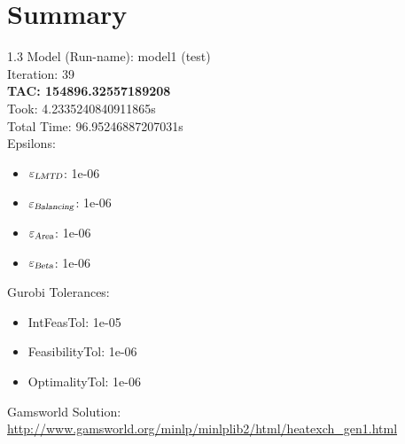 \documentclass{article}%
\begin{document}
%
\normalsize%
\section{Summary}%
\thispagestyle{plain}%
\begin{spacing}{1.3}%
\Large%
Model (Run-name): model1 (test)\\%
Iteration: 39\\%
\textbf{TAC: 154896.32557189208}\\%
Took: 4.2335240840911865s\\%
Total Time: 96.95246887207031s\\%
Epsilons:%
\begin{itemize}%
	\item $\varepsilon_{\textsl{LMTD}}$: 1e-06%
	\item $\varepsilon_{\textsl{Balancing}}$: 1e-06%
	\item $\varepsilon_{\textsl{Area}}$: 1e-06%
	\item $\varepsilon_{\textsl{Beta}}$: 1e-06%
\end{itemize}%
Gurobi Tolerances:%
\begin{itemize}%
	\item IntFeasTol: 1e-05%
	\item FeasibilityTol: 1e-06%
	\item OptimalityTol: 1e-06%
\end{itemize}%
\end{spacing}%
\normalsize%
Gamsworld Solution: \url{http://www.gamsworld.org/minlp/minlplib2/html/heatexch_gen1.html}%
%
\clearpage%
\end{document}
